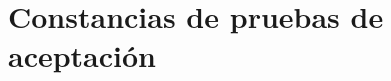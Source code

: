 {\chapter{Constancias de pruebas de aceptaci\'{o}n}
\thispagestyle{fancy}
\begin{figure}[htp]
\end{figure}

}
